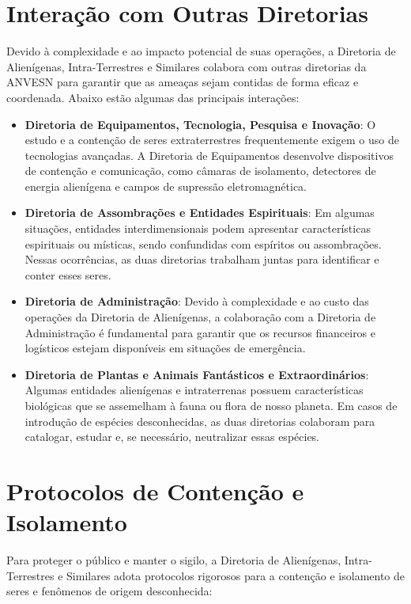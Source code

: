 \section{Interação com Outras Diretorias}

Devido à complexidade e ao impacto potencial de suas operações, a Diretoria de Alienígenas, Intra-Terrestres e Similares colabora com outras diretorias da ANVESN para garantir que as ameaças sejam contidas de forma eficaz e coordenada. Abaixo estão algumas das principais interações:

\begin{itemize}
    \item \textbf{Diretoria de Equipamentos, Tecnologia, Pesquisa e Inovação}: O estudo e a contenção de seres extraterrestres frequentemente exigem o uso de tecnologias avançadas. A Diretoria de Equipamentos desenvolve dispositivos de contenção e comunicação, como câmaras de isolamento, detectores de energia alienígena e campos de supressão eletromagnética.
    \item \textbf{Diretoria de Assombrações e Entidades Espirituais}: Em algumas situações, entidades interdimensionais podem apresentar características espirituais ou místicas, sendo confundidas com espíritos ou assombrações. Nessas ocorrências, as duas diretorias trabalham juntas para identificar e conter esses seres.
    \item \textbf{Diretoria de Administração}: Devido à complexidade e ao custo das operações da Diretoria de Alienígenas, a colaboração com a Diretoria de Administração é fundamental para garantir que os recursos financeiros e logísticos estejam disponíveis em situações de emergência.
    \item \textbf{Diretoria de Plantas e Animais Fantásticos e Extraordinários}: Algumas entidades alienígenas e intraterrenas possuem características biológicas que se assemelham à fauna ou flora de nosso planeta. Em casos de introdução de espécies desconhecidas, as duas diretorias colaboram para catalogar, estudar e, se necessário, neutralizar essas espécies.
\end{itemize}

\section{Protocolos de Contenção e Isolamento}
Para proteger o público e manter o sigilo, a Diretoria de Alienígenas, Intra-Terrestres e Similares adota protocolos rigorosos para a contenção e isolamento de seres e fenômenos de origem desconhecida:

